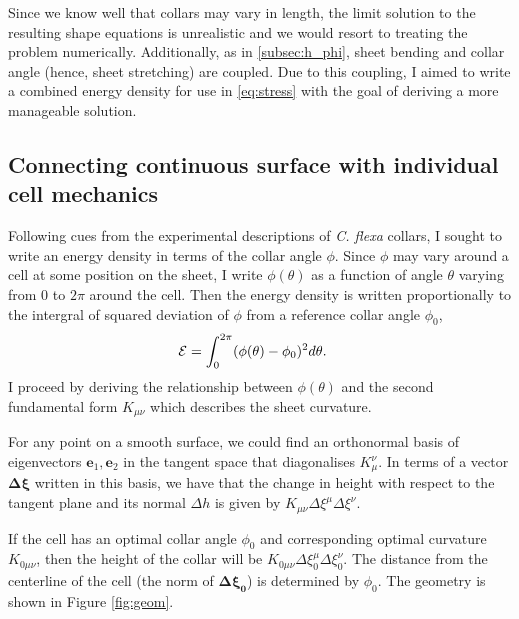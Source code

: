 Since we know well that collars may vary in length, the limit solution to the resulting shape equations is unrealistic and we would resort to treating the problem numerically.
Additionally, as in \cref{subsec:h_phi}, sheet bending and collar angle (hence, sheet stretching) are coupled. 
Due to this coupling, I aimed to write a combined energy density for use in \cref{eq:stress} with the goal of deriving a more manageable solution.

\subsection{Connecting continuous surface with individual cell mechanics}

Following cues from the experimental descriptions of \textit{C. flexa} collars, I sought to write an energy density in terms of the collar angle $\phi$. 
Since $\phi$ may vary around a cell at some position on the sheet, I write $\phi(\theta)$ as a function of angle $\theta$ varying from $0$ to $2\pi$ around the cell.
Then the energy density is written proportionally to the intergral of squared deviation of $\phi$ from a reference collar angle $\phi_0$,
\begin{align}
	\mathcal{E} &= \int_0^{2\pi} (\phi(\theta) - \phi_0)^2 d\theta. \label{eq:phi_int}
\end{align}
I proceed by deriving the relationship between $\phi(\theta)$ and the second fundamental form $K_{\mu\nu}$ which describes the sheet curvature.

For any point on a smooth surface, we could find an orthonormal basis of eigenvectors $\bm{e}_1, \bm{e}_2$ in the tangent space that diagonalises $K_\mu^\nu$. 
In terms of a vector $\bm{\Delta \xi}$ written in this basis, we have that the change in height with respect to the tangent plane and its normal $\Delta h$ is given by $K_{\mu\nu}\Delta\xi^\mu\Delta\xi^\nu$.

If the cell has an optimal collar angle $\phi_0$ and corresponding optimal curvature $K_{0\mu\nu}$, then the height of the collar will be $K_{0\mu\nu}\Delta\xi_0^\mu\Delta\xi_0^\nu$. 
The distance from the centerline of the cell (the norm of $\bm{\Delta\xi_0}$) is determined by $\phi_0$. The geometry is shown in Figure \ref{fig:geom}.

